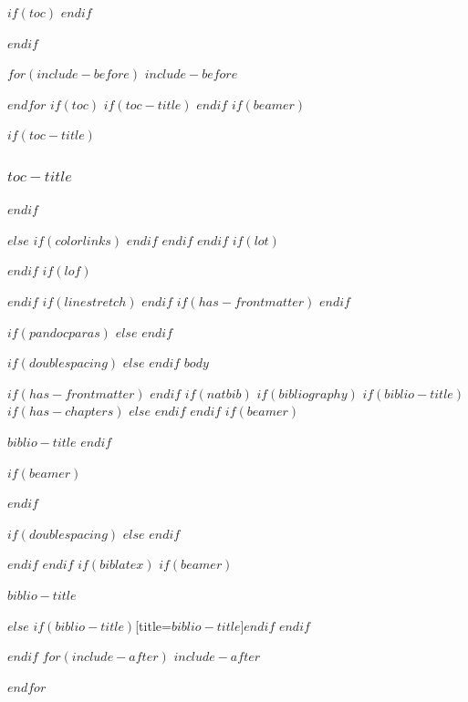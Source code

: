 \documentclass[
$if(fontsize)$
  $fontsize$,
$endif$
$if(lang)$
  $babel-lang$,
$endif$
$if(papersize)$
  $papersize$paper,
$endif$
$if(beamer)$
  ignorenonframetext,
$if(handout)$
  handout,
$endif$
$if(aspectratio)$
  aspectratio=$aspectratio$,
$endif$
$endif$
$for(classoption)$
  $classoption$$sep$,
$endfor$
]{$documentclass$}
\newif\ifbibliography
\begin{document}
$if(toc)$
{
\hypersetup{linkcolor=black}
\setcounter{tocdepth}{$toc-depth$}
\tableofcontents
}
$endif$

$endif$ %

$for(include-before)$
$include-before$

$endfor$
$if(toc)$
$if(toc-title)$
\renewcommand*\contentsname{$toc-title$}
$endif$
$if(beamer)$
\begin{frame}[allowframebreaks]
$if(toc-title)$
  \frametitle{$toc-title$}
$endif$
  \tableofcontents[hideallsubsections]
\end{frame}
$else$
{
$if(colorlinks)$
\hypersetup{linkcolor=$if(toccolor)$$toccolor$$else$$endif$}
$endif$
\setcounter{tocdepth}{$toc-depth$}
\tableofcontents
}
$endif$
$endif$
$if(lot)$
\listoftables
$endif$
$if(lof)$
\listoffigures
$endif$
$if(linestretch)$
$endif$
$if(has-frontmatter)$
\mainmatter
$endif$

$if(pandocparas)$
$else$
\setlength{\parindent}{16pt}
\setlength{\parskip}{0pt}
$endif$

$if(doublespacing)$
\doublespacing
$else$
$endif$
$body$

$if(has-frontmatter)$
\backmatter
$endif$
$if(natbib)$
$if(bibliography)$
$if(biblio-title)$
$if(has-chapters)$
\renewcommand\bibname{$biblio-title$}
$else$
\renewcommand\refname{$biblio-title$}
$endif$
$endif$
$if(beamer)$
\begin{frame}[allowframebreaks]{$biblio-title$}
  \bibliographytrue
$endif$
  
$if(beamer)$
\end{frame}
$endif$


$if(doublespacing)$
\singlespacing
$else$
$endif$

$endif$
$endif$
$if(biblatex)$
$if(beamer)$
\begin{frame}[allowframebreaks]{$biblio-title$}
  \bibliographytrue
  \printbibliography[heading=none]
\end{frame}
$else$
\printbibliography$if(biblio-title)$[title=$biblio-title$]$endif$
$endif$

$endif$
$for(include-after)$
$include-after$

$endfor$
\end{document}
